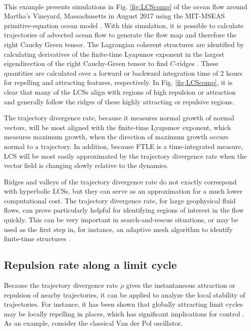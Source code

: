 \documentclass[twocolumn]{svjour3}
\begin{document}
 \\
This example presents simulations in Fig. \ref{fig:LCScomp} of the ocean flow around Martha's Vineyard, Massachusetts in August 2017 using the MIT-MSEAS primitive-equation ocean model \cite{haley2010multiscale}. With this simulation, it is possible to calculate trajectories of advected ocean flow to generate the flow map and therefore the right Cauchy Green tensor. The Lagrangian coherent structures are identified by calculating derivatives of the finite-time Lyapunov exponent in the largest eigendirection of the right Cauchy-Green tensor to find $C$-ridges \cite{schindler2012ridge}. These quantities are calculated over a forward or backward integration time of 2 hours for repelling and attracting features, respectively. In Fig. \ref{fig:LCScomp}, it is clear that many of the LCSs align with regions of high repulsion or attraction and generally follow the ridges of these highly attracting or repulsive regions.

The trajectory divergence rate, because it measures normal growth of normal vectors, will be most aligned with the finite-time Lyapunov exponent, which measures maximum growth, when the direction of maximum growth occurs normal to a trajectory. In addition, because FTLE is a time-integrated measure, LCS will be most easily approximated by the trajectory divergence rate when the vector field is changing slowly relative to the dynamics.

Ridges and valleys of the trajectory divergence rate do not exactly correspond with hyperbolic LCSs, but they can serve as an approximation for a much lower computational cost. The trajectory divergence rate, for large geophysical fluid flows, can prove particularly helpful for identifying regions of interest in the flow quickly. This can be very important in search-and-rescue situations, or may be used as the first step in, for instance, an adaptive mesh algorithm to identify finite-time structures \cite{lekien2010computation,xie2018lagrangian}.

\subsection{Repulsion rate along a limit cycle}
Because the trajectory divergence rate $\dot{\rho}$ gives the instantaneous attraction or repulsion of nearby trajectories, it can be applied to analyze the local stability of trajectories. For instance, it has been shown that globally attracting limit cycles may be locally repelling in places, which has significant implications for control \cite{ali1999local,norris2008revisiting}. As an example, consider the classical Van der Pol oscillator.
\end{document}
